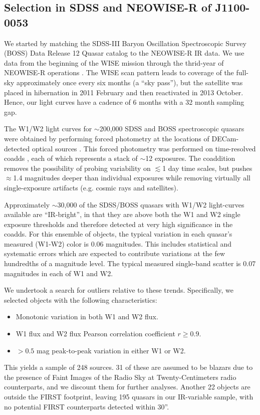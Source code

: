 \documentclass[a4paper,fleqn,usenatbib]{mnras}
\begin{document}
\subsection{Selection in SDSS and NEOWISE-R of J1100-0053}
We started by matching the SDSS-III Baryon Oscillation Spectroscopic
Survey (BOSS) Data Release 12 Quasar catalog \cite[DR12Q;
][]{Paris2017} to the NEOWISE-R IR data. We use data from the beginning of the WISE mission \citep[2010
January; ][]{Wright2010} through the thrid-year of NEOWISE-R
operations \citep[2016 December; ][]{Mainzer2011}. The WISE scan
pattern leads to coverage of the full-sky approximately once every six
months (a ``sky pass''), but the satellite was placed in hibernation
in 2011 February and then reactivated in 2013 October. Hence, our
light curves have a cadence of 6 months with a 32 month sampling gap.

The W1/W2 light curves for $\sim$200,000 SDSS and BOSS spectroscopic
quasars were obtained by performing forced photometry at the locations
of DECam-detected optical sources \citep{Lang2014, Meisner2017a,
Meisner2017b}. This forced photometry was performed on time-resolved
coadds \citep{Lang2014}, each of which represents a stack of $\sim$12
exposures. The coaddition removes the possibility of probing
variability on $\lesssim$1 day time scales, but pushes $\approx$1.4
magnitudes deeper than individual exposures while removing virtually
all single-exposure artifacts (e.g. cosmic rays and satellites).

Approximately $\sim$30,000 of the SDSS/BOSS quasars with W1/W2
light-curves available are ``IR-bright'', in that they are above both
the W1 and W2 single exposure thresholds and therefore detected at
very high significance in the coadds. For this ensemble of objects,
the typical variation in each quasar's measured (W1-W2) color is 0.06
magnitudes.  This includes statistical and systematic errors which are
expected to contribute variations at the few hundredths of a magnitude
level. The typical measured single-band scatter is 0.07 magnitudes in
each of W1 and W2.

We undertook a search for outliers relative to these
trends. Specifically, we selected objects with the following
characteristics:
\begin{itemize}
  \item Monotonic variation in both W1 and W2 flux.
  \item W1 flux and W2 flux Pearson correlation coefficient $r \geq0.9$.
  \item $>0.5$ mag peak-to-peak variation in either W1 or W2.
\end{itemize}
This yields a sample of 248 sources. 31 of these are assumed to be
blazars due to the presence of Faint Images of the Radio Sky at
Twenty-Centimeters \citep[FIRST; ][]{Becker1995} radio counterparts,
and we discount them for further analyses. Another 22 objects are
outside the FIRST footprint, leaving 195 quasars in our IR-variable
sample, with no potential FIRST counterparts detected within 30''. 
\end{document}
